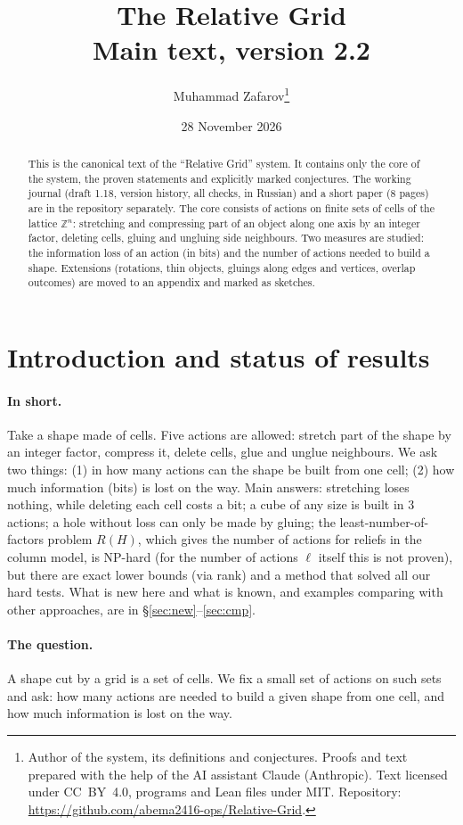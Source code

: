 \documentclass[11pt,a4paper]{article}
\title{\textbf{The Relative Grid}\\[4pt] \large Main text, version 2.2}
\author{Muhammad Zafarov\thanks{Author of the system, its definitions and conjectures. Proofs and text prepared with the help of the AI assistant Claude (Anthropic). Text licensed under CC~BY~4.0, programs and Lean files under MIT. Repository: \url{https://github.com/abema2416-ops/Relative-Grid}.}}
\date{28 November 2026}
\theoremstyle{plain}
\theoremstyle{definition}
\theoremstyle{remark}
\newcommand{\Z}{\mathbb{Z}}
\begin{document}
\sloppy
\maketitle

\begin{abstract}
This is the canonical text of the ``Relative Grid'' system. It contains only the core of the system, the proven statements and explicitly marked conjectures. The working journal (draft 1.18, version history, all checks, in Russian) and a short paper (8 pages) are in the repository separately. The core consists of actions on finite sets of cells of the lattice $\Z^n$: stretching and compressing part of an object along one axis by an integer factor, deleting cells, gluing and ungluing side neighbours. Two measures are studied: the information loss of an action (in bits) and the number of actions needed to build a shape. Extensions (rotations, thin objects, gluings along edges and vertices, overlap outcomes) are moved to an appendix and marked as sketches.
\end{abstract}

\tableofcontents

\section{Introduction and status of results}

\paragraph{In short.} Take a shape made of cells. Five actions are allowed: stretch part of the shape by an integer factor, compress it, delete cells, glue and unglue neighbours. We ask two things: (1) in how many actions can the shape be built from one cell; (2) how much information (bits) is lost on the way. Main answers: stretching loses nothing, while deleting each cell costs a bit; a cube of any size is built in 3 actions; a hole without loss can only be made by gluing; the least-number-of-factors problem $R(H)$, which gives the number of actions for reliefs in the column model, is NP-hard (for the number of actions $\ell$ itself this is not proven), but there are exact lower bounds (via rank) and a method that solved all our hard tests. What is new here and what is known, and examples comparing with other approaches, are in §\ref{sec:new}--\ref{sec:cmp}.

\paragraph{The question.} A shape cut by a grid is a set of cells. We fix a small set of actions on such sets and ask: how many actions are needed to build a given shape from one cell, and how much information is lost on the way.
\end{document}

